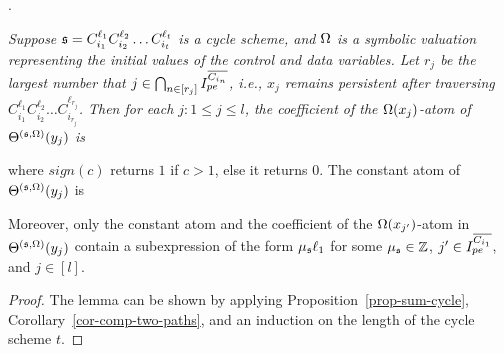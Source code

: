 \begin{appendix}
.
{\it Suppose ${\mathfrak{s} }=C_{i_1}^{\ell_1} C_{i_2}^{\ell_2} \dots C_{i_t}^{\ell_t}$ is a cycle scheme, and $\Omega$ is a symbolic valuation representing the initial values of the control and data variables. Let $r_j$ be the largest number that $j\in\bigcap_{n\in[r_j]} I^{\overline{C_{i_{n}}}}_{pe}$, i.e., $x_j$ remains persistent after traversing $C_{i_1}^{\ell_1} C_{i_2}^{\ell_2} \dots C_{i_{r_j}}^{\ell_{r_j}}$.
Then for each $j: 1 \le j \le l$, the coefficient of the $\Omega(x_{j})$-atom of $\Theta^{({\mathfrak{s} },\Omega)}(y_j)$ is
\begin{center}
\end{center}
 where $sign(c)$ returns $1$ if $c>1$, else it returns $0$. The constant atom of $\Theta^{({\mathfrak{s} },\Omega)}(y_j)$ is 
\begin{center}
\end{center}
Moreover, only the constant atom and the coefficient of the $\Omega(x_{j'})$-atom in $\Theta^{({\mathfrak{s} },\Omega)}(y_j)$ contain a subexpression of the form $ \mu_{\mathfrak{s} } \ell_1$ for some $\mu_{\mathfrak{s} }\in {\mathbb{Z} }$, $j' \in  I^{\overline{C_{i_{1}}}}_{pe}$, and $j \in [l]$.
}

\begin{proof}
The lemma can be shown by applying Proposition~\ref{prop-sum-cycle}, Corollary~\ref{cor-comp-two-paths}, and an induction on the length of the cycle scheme $t$.



\end{proof}
\end{appendix}
